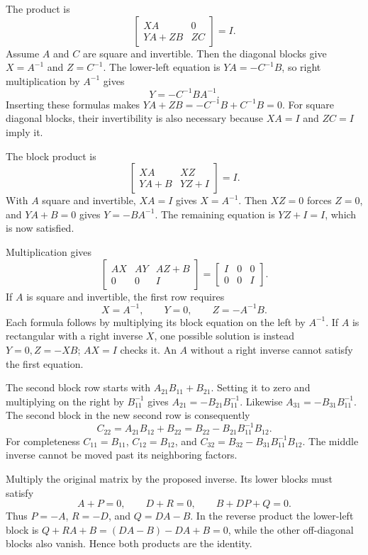 The product is
\[\begin{bmatrix}XA&0\\YA+ZB&ZC\end{bmatrix}=I.\]
Assume $A$ and $C$ are square and invertible. Then the diagonal
blocks give $X=A^{-1}$ and $Z=C^{-1}$. The lower-left equation is
$YA=-C^{-1}B$, so right multiplication by $A^{-1}$ gives
\[Y=-C^{-1}BA^{-1}.\]
Inserting these formulas makes $YA+ZB=-C^{-1}B+C^{-1}B=0$.
For square diagonal blocks, their invertibility is also necessary
because $XA=I$ and $ZC=I$ imply it.

The block product is
\[\begin{bmatrix}XA&XZ\\YA+B&YZ+I\end{bmatrix}=I.\]
With $A$ square and invertible, $XA=I$ gives $X=A^{-1}$.
Then $XZ=0$ forces $Z=0$, and $YA+B=0$ gives $Y=-BA^{-1}$.
The remaining equation is $YZ+I=I$, which is now satisfied.

Multiplication gives
\[\begin{bmatrix}AX&AY&AZ+B\\0&0&I\end{bmatrix}
=\begin{bmatrix}I&0&0\\0&0&I\end{bmatrix}.\]
If $A$ is square and invertible, the first row requires
\[X=A^{-1},\qquad Y=0,\qquad Z=-A^{-1}B.\]
Each formula follows by multiplying its block equation on the left
by $A^{-1}$. If $A$ is rectangular with a right inverse $X$, one
possible solution is instead $Y=0,Z=-XB$; $AX=I$ checks it.
An $A$ without a right inverse cannot satisfy the first equation.

The second block row starts with $A_{21}B_{11}+B_{21}$.
Setting it to zero and multiplying on the right by $B_{11}^{-1}$
gives $A_{21}=-B_{21}B_{11}^{-1}$. Likewise
$A_{31}=-B_{31}B_{11}^{-1}$.
The second block in the new second row is consequently
\[C_{22}=A_{21}B_{12}+B_{22}
=B_{22}-B_{21}B_{11}^{-1}B_{12}.\]
For completeness $C_{11}=B_{11}$, $C_{12}=B_{12}$, and
$C_{32}=B_{32}-B_{31}B_{11}^{-1}B_{12}$.
The middle inverse cannot be moved past its neighboring factors.

Multiply the original matrix by the proposed inverse. Its lower
blocks must satisfy
\[A+P=0,\qquad D+R=0,\qquad B+DP+Q=0.\]
Thus $P=-A$, $R=-D$, and $Q=DA-B$.
In the reverse product the lower-left block is
$Q+RA+B=(DA-B)-DA+B=0$, while the other off-diagonal blocks
also vanish. Hence both products are the identity.

